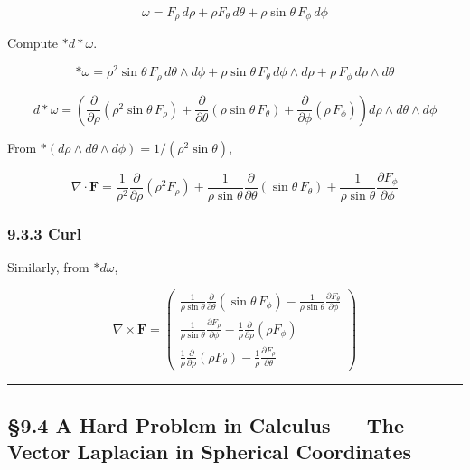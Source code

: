 \[\omega = F_\rho\,d\rho + \rho F_\theta\,d\theta + \rho\sin\theta\,F_\phi\,d\phi\]

Compute \(\ast d\ast\omega\).

\[\ast\omega = \rho^2\sin\theta\,F_\rho\,d\theta\wedge d\phi + \rho\sin\theta\,F_\theta\,d\phi\wedge d\rho + \rho\,F_\phi\,d\rho\wedge d\theta\]

\[d\ast\omega = \left(\frac{\partial}{\partial\rho}(\rho^2\sin\theta\,F_\rho) + \frac{\partial}{\partial\theta}(\rho\sin\theta\,F_\theta) + \frac{\partial}{\partial\phi}(\rho\,F_\phi)\right) d\rho\wedge d\theta\wedge d\phi\]

From \(\ast(d\rho\wedge d\theta\wedge d\phi) = 1/(\rho^2\sin\theta)\),

\[\nabla \cdot \mathbf{F} = \frac{1}{\rho^2}\frac{\partial}{\partial\rho}(\rho^2 F_\rho) + \frac{1}{\rho\sin\theta}\frac{\partial}{\partial\theta}(\sin\theta\,F_\theta) + \frac{1}{\rho\sin\theta}\frac{\partial F_\phi}{\partial\phi}\]

\hypertarget{curl-3}{%
\subsubsection{9.3.3 Curl}\label{curl-3}}

Similarly, from \(\ast d\omega\),

\[\nabla \times \mathbf{F} = \begin{pmatrix}
\frac{1}{\rho\sin\theta}\frac{\partial}{\partial\theta}(\sin\theta\,F_\phi) - \frac{1}{\rho\sin\theta}\frac{\partial F_\theta}{\partial\phi} \\[0.3em]
\frac{1}{\rho\sin\theta}\frac{\partial F_\rho}{\partial\phi} - \frac{1}{\rho}\frac{\partial}{\partial\rho}(\rho F_\phi) \\[0.3em]
\frac{1}{\rho}\frac{\partial}{\partial\rho}(\rho F_\theta) - \frac{1}{\rho}\frac{\partial F_\rho}{\partial\theta}
\end{pmatrix}\]

\begin{center}\rule{0.5\linewidth}{0.5pt}\end{center}

\hypertarget{a-hard-problem-in-calculus-the-vector-laplacian-in-spherical-coordinates}{%
\subsection{§9.4 A Hard Problem in Calculus --- The Vector Laplacian in
Spherical
Coordinates}\label{a-hard-problem-in-calculus-the-vector-laplacian-in-spherical-coordinates}}


